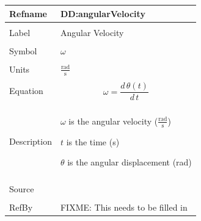 \documentclass[12pt]{article}
\begin{document}
\noindent \begin{minipage}{\textwidth}
\begin{tabular}{p{} p{}}
\toprule \textbf{Refname} & \textbf{DD:angularVelocity}
\label{DD:angularVelocity}
\\ \midrule \\
Label & Angular Velocity
\\ \midrule \\
Symbol & $ω$
\\ \midrule \\
Units & $\frac{\text{rad}}{\text{s}}$
\\ \midrule \\
Equation & \begin{dmath}
           ω=\frac{d\,θ\left(t\right)}{d\,t}
           \end{dmath}
\\ \midrule \\
Description & \begin{symbDescription}
              \item{$ω$ is the angular velocity ($\frac{\text{rad}}{\text{s}}$)}
              \item{$t$ is the time (s)}
              \item{$θ$ is the angular displacement (rad)}
              \end{symbDescription}
\\ \midrule \\
Source & 
\\ \midrule \\
RefBy & FIXME: This needs to be filled in
\\ \bottomrule \end{tabular}
\end{minipage}\\
~\newline
\end{document}
